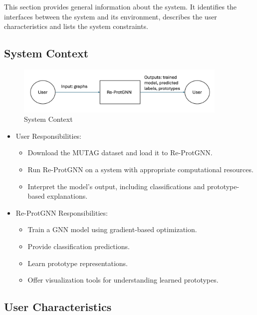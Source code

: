 \documentclass[12pt]{article}
\begin{document}
This section provides general information about the system.  It identifies the
interfaces between the system and its environment, describes the user
characteristics and lists the system constraints.

\subsection{System Context}


\begin{figure}[h!]
\begin{center}
 \includegraphics[width=0.9\textwidth]{SystemContextFigure}
\caption{System Context}
\label{Fig_SystemContext} 
\end{center}
\end{figure}

\begin{itemize}
\item User Responsibilities:
\begin{itemize}
\item Download the MUTAG dataset and load it to Re-ProtGNN. 
\item Run Re-ProtGNN on a system with appropriate computational resources.
\item Interpret the model’s output, including classifications and prototype-based explanations.
\end{itemize}
\item Re-ProtGNN Responsibilities:
\begin{itemize}
\item Train a GNN model using gradient-based optimization.
\item Provide classification predictions.
\item Learn prototype representations.
\item Offer visualization tools for understanding learned prototypes.
\end{itemize}
\end{itemize}

\subsection{User Characteristics} \label{SecUserCharacteristics}
\end{document}
